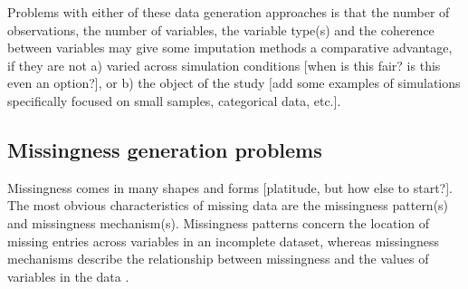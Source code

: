 \documentclass[bimj,fleqn]{w-art}
\begin{document}
Problems with either of these data generation approaches is that the number of observations, the number of variables, the variable type(s) and the coherence between variables may give some imputation methods a comparative advantage, if they are not a) varied across simulation conditions [when is this fair? is this even an option?], or b) the object of the study [add some examples of simulations specifically focused on small samples, categorical data, etc.].


\subsection{Missingness generation problems}

Missingness comes in many shapes and forms [platitude, but how else to start?]. The most obvious characteristics of missing data are the missingness pattern(s) and missingness mechanism(s). Missingness patterns concern the location of missing entries across variables in an incomplete dataset, whereas missingness mechanisms describe the relationship between missingness and the values of variables in the data \citep[][p. 8]{litt20}.

\end{document}
